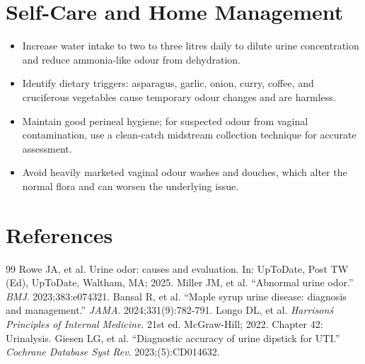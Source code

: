 \section*{Self-Care and Home Management}
\begin{itemize}
  \item Increase water intake to two to three litres daily to dilute urine concentration and reduce ammonia-like odour from dehydration.
  \item Identify dietary triggers: asparagus, garlic, onion, curry, coffee, and cruciferous vegetables cause temporary odour changes and are harmless.
  \item Maintain good perineal hygiene; for suspected odour from vaginal contamination, use a clean-catch midstream collection technique for accurate assessment.
  \item Avoid heavily marketed vaginal odour washes and douches, which alter the normal flora and can worsen the underlying issue.
\end{itemize}

\section*{References}
\begin{thebibliography}{99}
 Rowe JA, et al. Urine odor: causes and evaluation. In: UpToDate, Post TW (Ed), UpToDate, Waltham, MA; 2025.
 Miller JM, et al. ``Abnormal urine odor.'' \emph{BMJ}. 2023;383:e074321.
 Bansal R, et al. ``Maple syrup urine disease: diagnosis and management.'' \emph{JAMA}. 2024;331(9):782-791.
 Longo DL, et al. \emph{Harrison\'s Principles of Internal Medicine}. 21st ed. McGraw-Hill; 2022. Chapter 42: Urinalysis.
 Giesen LG, et al. ``Diagnostic accuracy of urine dipstick for UTI.'' \emph{Cochrane Database Syst Rev}. 2023;(5):CD014632.
\end{thebibliography}
